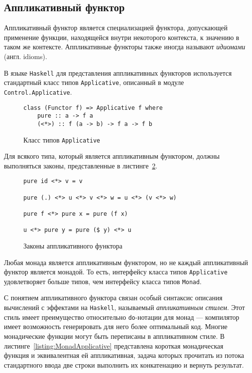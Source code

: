 \subsection{Аппликативный функтор}

Аппликативный функтор является специализацией функтора, допускающей применение 
функции, находящейся внутри некоторого контекста, к значению в таком же 
контексте. Аппликативные функторы также иногда называют \emph{идиомами} 
(англ. idioms).

В языке \lstinline{Haskell} для представления аппликативных функторов 
используется стандартный класс типов \lstinline{Applicative}, 
описанный в модуле \lstinline{Control.Applicative}.

\begin{figure}[h]
\begin{lstlisting}
class (Functor f) => Applicative f where
    pure :: a -> f a
    (<*>) :: f (a -> b) -> f a -> f b
\end{lstlisting}
\caption{Класс типов \lstinline{Applicative}}
\label{listing:Applicative}
\end{figure}

Для всякого типа, который является аппликативным функтором, должны выполняться 
законы, представленные в листинге~\ref{listing:ApplicativeLaws}.

\begin{figure}[h]
\begin{lstlisting}
pure id <*> v = v

pure (.) <*> u <*> v <*> w = u <*> (v <*> w)

pure f <*> pure x = pure (f x)

u <*> pure y = pure ($ y) <*> u
\end{lstlisting}
\caption{Законы аппликативного функтора}
\label{listing:ApplicativeLaws}
\end{figure}

Любая монада является аппликативным функтором, но не каждый аппликативный 
функтор является монадой. То есть, интерфейсу класса типов 
\lstinline{Applicative} удовлетворяет больше типов, чем интерфейсу класса типов 
\lstinline{Monad}.

С понятием аппликативного функтора связан особый синтаксис описания вычислений с 
эффектами на \lstinline{Haskell}, называемый \emph{аппликативным стилем}. Этот 
стиль имеет преимущество относительно \lstinline{do}-нотации для монад --- 
компилятор имеет возможность генерировать для него более оптимальный код. 
Многие монадические функции могут быть переписаны в аппликативном стиле. 
В листинге~\ref{listing:MonadApplicative} представлена короткая монадическая 
функция и эквивалентная ей аппликативная, задача которых прочитать из потока 
стандартного ввода две строки выполнить их конкатенацию и вернуть результат.

